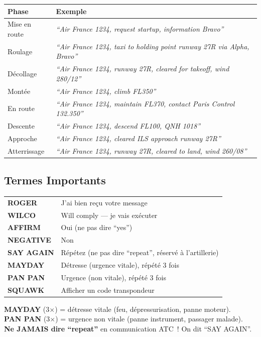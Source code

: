 \begin{tabular}{p{3cm}p{11.5cm}}
\toprule
\textbf{Phase} & \textbf{Exemple} \\
\midrule
Mise en route & \textit{``Air France 1234, request startup, information Bravo''} \\
Roulage & \textit{``Air France 1234, taxi to holding point runway 27R via Alpha, Bravo''} \\
Décollage & \textit{``Air France 1234, runway 27R, cleared for takeoff, wind 280/12''} \\
Montée & \textit{``Air France 1234, climb FL350''} \\
En route & \textit{``Air France 1234, maintain FL370, contact Paris Control 132.350''} \\
Descente & \textit{``Air France 1234, descend FL100, QNH 1018''} \\
Approche & \textit{``Air France 1234, cleared ILS approach runway 27R''} \\
Atterrissage & \textit{``Air France 1234, runway 27R, cleared to land, wind 260/08''} \\
\bottomrule
\end{tabular}

\subsection{Termes Importants}

\begin{tabular}{p{3cm}p{11.5cm}}
\toprule
\textbf{ROGER} & J'ai bien reçu votre message \\
\textbf{WILCO} & Will comply --- je vais exécuter \\
\textbf{AFFIRM} & Oui (ne pas dire ``yes'') \\
\textbf{NEGATIVE} & Non \\
\textbf{SAY AGAIN} & Répétez (ne pas dire ``repeat'', réservé à l'artillerie) \\
\textbf{MAYDAY} & Détresse (urgence vitale), répété 3 fois \\
\textbf{PAN PAN} & Urgence (non vitale), répété 3 fois \\
\textbf{SQUAWK} & Afficher un code transpondeur \\
\bottomrule
\end{tabular}

\begin{warnbox}
\textbf{MAYDAY} (3$\times$) = détresse vitale (feu, dépressurisation, panne moteur).\\
\textbf{PAN PAN} (3$\times$) = urgence non vitale (panne instrument, passager malade).\\
\textbf{Ne JAMAIS dire ``repeat''} en communication ATC~! On dit ``SAY AGAIN''.
\end{warnbox}

